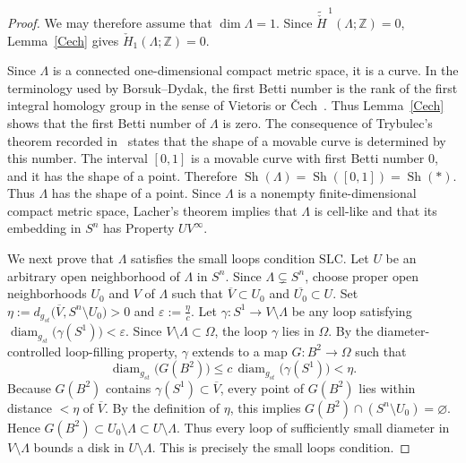 \documentclass[12pt,oneside,a4paper]{article}
\theoremstyle{mytheorem}
\theoremstyle{remark}
\theoremstyle{definition}
\begin{document}
\begin{proof}
We may therefore assume that \(\dim\Lambda=1\). Since
\(\widetilde{\check H}^{\,1}(\Lambda;\mathbb Z)=0\),
Lemma~\ref{Cech} gives
\(\check H_1(\Lambda;\mathbb Z)=0\).

Since \(\Lambda\) is a connected one-dimensional compact metric space, it is
a curve. In the terminology used by Borsuk--Dydak, the first Betti number is
the rank of the first integral homology group in the sense of Vietoris or
\v{C}ech~\cite[p.~163]{zbMATH03707364}. Thus Lemma~\ref{Cech} shows that the
first Betti number of \(\Lambda\) is zero. The consequence of Trybulec's
theorem recorded in~\cite[Theorem~8.2 and the ensuing paragraph,
p.~180]{zbMATH03707364} states that the shape of a movable curve is determined
by this number. The interval \([0,1]\) is a
movable curve with first Betti number \(0\), and it has the shape of a
point. Therefore
\(\operatorname{Sh}(\Lambda)
=
\operatorname{Sh}([0,1])
=
\operatorname{Sh}(*)\).
Thus \(\Lambda\) has the shape of a point. Since \(\Lambda\) is a nonempty
finite-dimensional compact metric space, Lacher's theorem
\cite[Theorem~1.1]{zbMATH03290989} implies that \(\Lambda\) is cell-like and
that its embedding in \(S^n\) has Property \(UV^\infty\).

We next prove that \(\Lambda\) satisfies the small loops condition
\(\mathrm{SLC}\). Let \(U\) be an arbitrary open neighborhood of
\(\Lambda\) in \(S^n\). Since \(\Lambda\subsetneq S^n\), choose proper
open neighborhoods \(U_0\) and \(V\) of \(\Lambda\) such that
\(\overline V\subset U_0\) and \(\overline{U_0}\subset U\). Set
\(\eta:=d_{g_{st}}\bigl(\overline V,S^n\setminus U_0\bigr)>0\)
and \(\varepsilon:=\frac{\eta}{c}\).
Let \(\gamma\colon S^1\to V\setminus\Lambda\) be any loop satisfying
\(\operatorname{diam}_{g_{st}}\bigl(\gamma(S^1)\bigr)<\varepsilon\). Since
\(V\setminus\Lambda\subset\Omega\), the loop \(\gamma\) lies in \(\Omega\).
By the diameter-controlled loop-filling property, \(\gamma\) extends to a map
\(G\colon B^2\to\Omega\) such that
\[
    \operatorname{diam}_{g_{st}}\bigl(G(B^2)\bigr)
    \le c\,\operatorname{diam}_{g_{st}}\bigl(\gamma(S^1)\bigr)
    <\eta.
\]
Because \(G(B^2)\) contains \(\gamma(S^1)\subset\overline V\), every point
of \(G(B^2)\) lies within distance \(<\eta\) of \(\overline V\). By the
definition of \(\eta\), this implies
\(G(B^2)\cap(S^n\setminus U_0)=\varnothing\). Hence
\(G(B^2)\subset U_0\setminus\Lambda\subset U\setminus\Lambda\).
Thus every loop of sufficiently small diameter in \(V\setminus\Lambda\)
bounds a disk in \(U\setminus\Lambda\). This is precisely the small loops
condition.


\end{proof}
\end{document}

